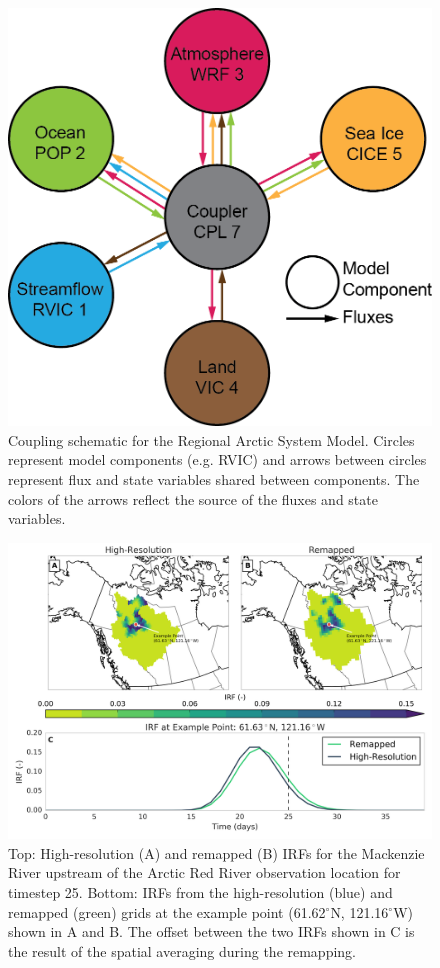\documentclass[jgrga, draft]{agutex}
\begin{document}
\clearpage
\begin{figure}
\noindent\includegraphics[width=40pc,natwidth=1]{RASM_coupling_schematic}
\caption{Coupling schematic for the Regional Arctic System Model. Circles represent model components (e.g. RVIC) and arrows between circles represent flux and state variables shared between components. The colors of the arrows reflect the source of the fluxes and state variables.}
\label{fig:rasm_coupling_schematic}
\end{figure}

\clearpage
\begin{figure}
\noindent\includegraphics[width=40pc,natwidth=1]{uh_remap_schematic}
\caption{Top: High-resolution (A) and remapped (B) IRFs for the Mackenzie River upstream of the Arctic Red River observation location for timestep 25.
Bottom: IRFs from the high-resolution (blue) and remapped (green) grids at the example point (61.62$^\circ$N, 121.16$^\circ$W) shown in A and B.
The offset between the two IRFs shown in C is the result of the spatial averaging during the remapping.}
\label{fig:uh_remap_schematic}
\end{figure}
\end{document}
